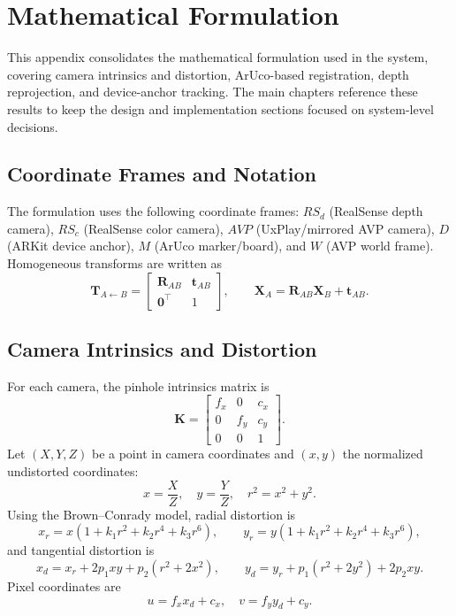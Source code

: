 \appendix

\section{Mathematical Formulation}
\label{app:math_full}

This appendix consolidates the mathematical formulation used in the system, covering camera intrinsics and distortion, ArUco-based registration, depth reprojection, and device-anchor tracking. The main chapters reference these results to keep the design and implementation sections focused on system-level decisions.

\subsection{Coordinate Frames and Notation}
The formulation uses the following coordinate frames: $RS_d$ (RealSense depth camera), $RS_c$ (RealSense color camera), $AVP$ (UxPlay/mirrored AVP camera), $D$ (ARKit device anchor), $M$ (ArUco marker/board), and $W$ (AVP world frame). Homogeneous transforms are written as
\[
\mathbf{T}_{A \leftarrow B} =
\begin{bmatrix}
\mathbf{R}_{AB} & \mathbf{t}_{AB} \\
\mathbf{0}^\top & 1
\end{bmatrix},
\qquad
\mathbf{X}_A = \mathbf{R}_{AB}\mathbf{X}_B + \mathbf{t}_{AB}.
\]

\subsection{Camera Intrinsics and Distortion}
\label{app:intrinsics_distortion_full}
For each camera, the pinhole intrinsics matrix is
\[
\mathbf{K} =
\begin{bmatrix}
f_x & 0 & c_x \\
0 & f_y & c_y \\
0 & 0 & 1
\end{bmatrix}.
\]
Let $(X,Y,Z)$ be a point in camera coordinates and $(x,y)$ the normalized undistorted coordinates:
\[
x = \frac{X}{Z}, \quad y = \frac{Y}{Z}, \quad r^2 = x^2 + y^2.
\]
Using the Brown--Conrady model, radial distortion is
\[
x_r = x \left( 1 + k_1 r^2 + k_2 r^4 + k_3 r^6 \right),
\qquad
y_r = y \left( 1 + k_1 r^2 + k_2 r^4 + k_3 r^6 \right),
\]
and tangential distortion is
\[
x_d = x_r + 2 p_1 x y + p_2 (r^2 + 2 x^2),
\qquad
y_d = y_r + p_1 (r^2 + 2 y^2) + 2 p_2 x y.
\]
Pixel coordinates are
\[
u = f_x x_d + c_x, \quad v = f_y y_d + c_y.
\]

